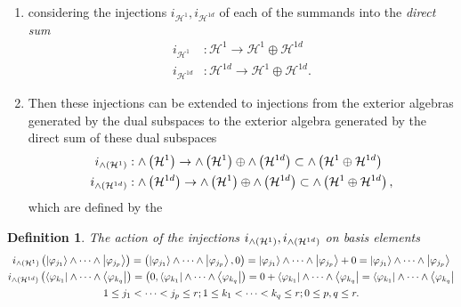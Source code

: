 \documentclass[aps,preprint]{revtex4}%
\newtheorem{definition}[theorem]{Definition}
\begin{document}
\begin{enumerate}
\item considering the injections $i_{\mathcal{H}^{1}},i_{\mathcal{H}^{1d}}$ of
each of the summands into the \emph{direct sum}%
\begin{align}
i_{\mathcal{H}^{1}}  &  :\mathcal{H}^{1}\rightarrow\mathcal{H}^{1}%
\oplus\mathcal{H}^{1d}\\
i_{\mathcal{H}^{1d}}  &  :\mathcal{H}^{1d}\rightarrow\mathcal{H}^{1}%
\oplus\mathcal{H}^{1d}.
\end{align}


\item Then these injections can be extended to injections from the exterior
algebras generated by the dual subspaces to the exterior algebra generated by
the direct sum of these dual subspaces
\begin{align}
i_{{\huge \wedge}\left(  \mathcal{H}^{1}\right)  }  &  :{\huge \wedge}\left(
\mathcal{H}^{1}\right)  \rightarrow{\huge \wedge}\left(  \mathcal{H}%
^{1}\right)  \oplus{\huge \wedge}\left(  \mathcal{H}^{1d}\right)
\subset{\huge \wedge}\left(  \mathcal{H}^{1}\oplus\mathcal{H}^{1d}\right) \\
i_{{\huge \wedge}\left(  \mathcal{H}^{1d}\right)  }  &  :{\huge \wedge}\left(
\mathcal{H}^{1d}\right)  \rightarrow{\huge \wedge}\left(  \mathcal{H}%
^{1}\right)  \oplus{\huge \wedge}\left(  \mathcal{H}^{1d}\right)
\subset{\huge \wedge}\left(  \mathcal{H}^{1}\oplus\mathcal{H}^{1d}\right)  ,
\end{align}
which are defined by the
\end{enumerate}

\begin{definition}
The action of the injections $i_{{\huge \wedge}\left(  \mathcal{H}^{1}\right)
},i_{{\huge \wedge}\left(  \mathcal{H}^{1d}\right)  }$ on basis elements
\begin{gather}
i_{{\huge \wedge}\left(  \mathcal{H}^{1}\right)  }\left(  \left\vert
\varphi_{j_{1}}\right\rangle \wedge\cdots\wedge\left\vert \varphi_{j_{p}%
}\right\rangle \right)  =\left(  \left\vert \varphi_{j_{1}}\right\rangle
\wedge\cdots\wedge\left\vert \varphi_{j_{p}}\right\rangle ,0\right)
=\left\vert \varphi_{j_{1}}\right\rangle \wedge\cdots\wedge\left\vert
\varphi_{j_{p}}\right\rangle +0=\left\vert \varphi_{j_{1}}\right\rangle
\wedge\cdots\wedge\left\vert \varphi_{j_{p}}\right\rangle \\
i_{{\huge \wedge}\left(  \mathcal{H}^{1d}\right)  }\left(  \left\langle
\varphi_{k_{1}}\right\vert \wedge\cdots\wedge\left\langle \varphi_{k_{q}%
}\right\vert \right)  =\left(  0,\left\langle \varphi_{k_{1}}\right\vert
\wedge\cdots\wedge\left\langle \varphi_{k_{q}}\right\vert \right)
=0+\left\langle \varphi_{k_{1}}\right\vert \wedge\cdots\wedge\left\langle
\varphi_{k_{q}}\right\vert =\left\langle \varphi_{k_{1}}\right\vert
\wedge\cdots\wedge\left\langle \varphi_{k_{q}}\right\vert \\
1\leq j_{1}<\cdots<j_{p}\leq r;1\leq k_{1}<\cdots<k_{q}\leq r;0\leq p,q\leq r.
\end{gather}

\end{definition}
\end{document}
